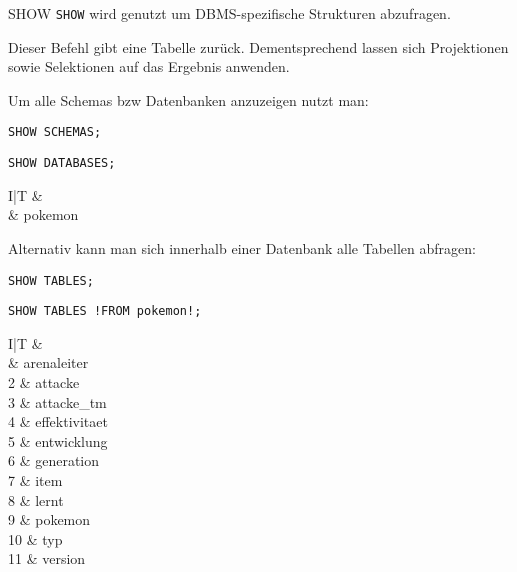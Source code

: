 \begin{sql}{SHOW}
    \texttt{SHOW} wird genutzt um DBMS-spezifische Strukturen abzufragen.

    Dieser Befehl gibt eine Tabelle zurück.
    Dementsprechend lassen sich Projektionen sowie Selektionen auf das Ergebnis anwenden.

    Um alle Schemas bzw Datenbanken anzuzeigen nutzt man:

    \begin{lstlisting}[language=mysql]
        SHOW SCHEMAS;
    \end{lstlisting}

    \begin{lstlisting}[language=mysql]
        SHOW DATABASES;
    \end{lstlisting}

    \setcounter{rownum}{0}
    \begin{tabular}{I|T}
        &  \\ & pokemon \\
    \end{tabular}

    Alternativ kann man sich innerhalb einer Datenbank alle Tabellen abfragen:

    \begin{lstlisting}[language=mysql]
        SHOW TABLES;
    \end{lstlisting}

    \begin{lstlisting}[language=mysql]
        SHOW TABLES !FROM pokemon!;
    \end{lstlisting}

    \setcounter{rownum}{0}
    \begin{tabular}{I|T}
        &  \\ & arenaleiter \\
        2 & attacke \\
        3 & attacke\_tm \\
        4 & effektivitaet \\
        5 & entwicklung \\
        6 & generation \\
        7 & item \\
        8 & lernt \\
        9 & pokemon \\
        10 & typ \\
        11 & version \\
    \end{tabular}


\end{sql}
